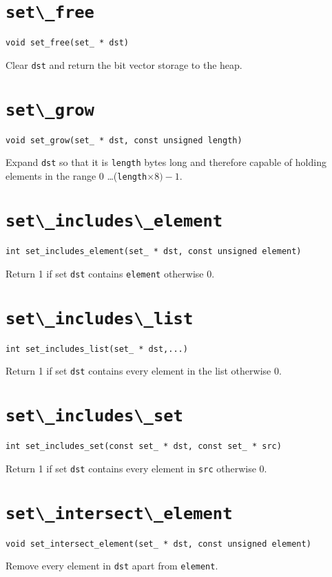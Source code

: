\section{\protect\verb+set\_free+}
\begin{verbatim}
void set_free(set_ * dst)
\end{verbatim}
Clear {\tt dst} and return the bit vector storage to the heap.

\section{\protect\verb+set\_grow+}
\begin{verbatim}
void set_grow(set_ * dst, const unsigned length)
\end{verbatim}
Expand {\tt dst} so that it is {\tt length} bytes long and therefore
capable of holding elements in the range 0 \ldots ({\tt length}$\times8) -1$.

\section{\protect\verb+set\_includes\_element+}
\begin{verbatim}
int set_includes_element(set_ * dst, const unsigned element)
\end{verbatim}
Return 1 if set {\tt dst} contains {\tt element} otherwise 0.

\section{\protect\verb+set\_includes\_list+}
\begin{verbatim}
int set_includes_list(set_ * dst,...)
\end{verbatim}
Return 1 if set {\tt dst} contains every element in the list otherwise 0.

\section{\protect\verb+set\_includes\_set+}
\begin{verbatim}
int set_includes_set(const set_ * dst, const set_ * src)
\end{verbatim}
Return 1 if set {\tt dst} contains every element in {\tt src} otherwise 0.

\section{\protect\verb+set\_intersect\_element+}
\begin{verbatim}
void set_intersect_element(set_ * dst, const unsigned element)
\end{verbatim}
Remove every element in {\tt dst} apart from {\tt element}.

